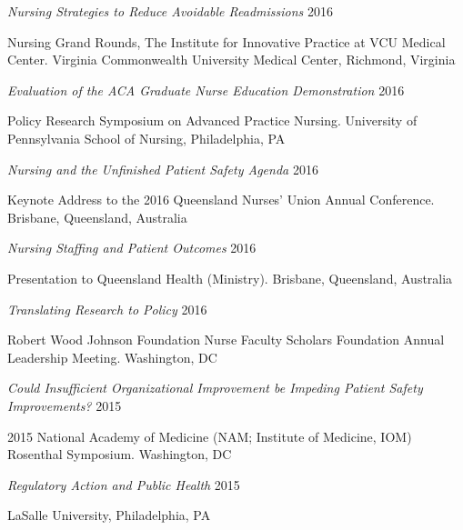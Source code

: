 \documentclass[10pt,]{article}
\begin{document}
{{{{{{{{{{{{{{{\begin{hangparas}{.5in}{1}
{\textit {Nursing Strategies to Reduce Avoidable Readmissions}} \hfill 2016 
\vspace{-2.5mm}
\begin{adjustwidth}{0.5cm}{1cm}
Nursing Grand Rounds, The Institute for Innovative Practice at VCU Medical Center. Virginia Commonwealth University Medical Center, Richmond, Virginia
\end{adjustwidth}

{\textit {Evaluation of the ACA Graduate Nurse Education Demonstration}} \hfill 2016 
\vspace{-2.5mm}
\begin{adjustwidth}{0.5cm}{1cm}
Policy Research Symposium on Advanced Practice Nursing. University of Pennsylvania School of Nursing, Philadelphia, PA
\end{adjustwidth}

{\textit {Nursing and the Unfinished Patient Safety Agenda}} \hfill 2016 
\vspace{-2.5mm}
\begin{adjustwidth}{0.5cm}{1cm}
Keynote Address to the 2016 Queensland Nurses’ Union Annual Conference. Brisbane, Queensland, Australia
\end{adjustwidth}

{\textit {Nursing Staffing and Patient Outcomes}} \hfill 2016 
\vspace{-2.5mm}
\begin{adjustwidth}{0.5cm}{1cm}
Presentation to Queensland Health (Ministry). Brisbane, Queensland, Australia
\end{adjustwidth}

{\textit {Translating Research to Policy}} \hfill 2016 
\vspace{-2.5mm}
\begin{adjustwidth}{0.5cm}{1cm}
Robert Wood Johnson Foundation Nurse Faculty Scholars Foundation Annual Leadership Meeting. Washington, DC
\end{adjustwidth}

 {\textit {Could Insufficient Organizational Improvement be Impeding Patient Safety Improvements?}} \hfill 2015 
\vspace{-2.5mm}
\begin{adjustwidth}{0.5cm}{1cm}
2015 National Academy of Medicine (NAM; Institute of Medicine, IOM) Rosenthal Symposium. Washington, DC
\end{adjustwidth}

{\textit {Regulatory Action and Public Health}} \hfill 2015 
\vspace{-2.5mm}
\begin{adjustwidth}{0.5cm}{1cm}
LaSalle University, Philadelphia, PA
\end{adjustwidth}


\end{hangparas}}}}}}}}}}}}}}}}
\end{document}
